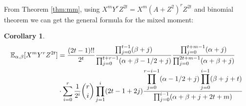 \documentclass[review,authoryear]{elsarticle}
\def\E{\mathbb{E}}
\newtheorem{cor}{Corollary}
\begin{document}
From Theorem \ref{thm:mm},
using $X^m Y^r Z^{2t} = X^m(A+Z^2)^r Z^{2t} $ and
binomial theorem we can get
the general formula for the mixed moment:
\begin{cor}
\begin{align}
\E_{\alpha, \beta}[X^mY^rZ^{2t}] &= \frac{(2t-1)!!}{2^t}
\frac{\prod_{j=0}^{t-1} (\beta+j)}{\prod_{j=0}^{t+r-1} (\alpha+\beta-1/2+j)}
\frac{\prod_{j=0}^{t+m-1}(\alpha+j)}{\prod_{j=0}^{2t+m-1} (\alpha+\beta+j)}\notag\\
&\cdot\sum_{i=0}^r \frac{1}{2^i}\binom{r}{i}\prod_{j=1}^i (2t-1+2j)
\frac{\displaystyle\prod_{j=0}^{r-i-1}(\alpha-1/2+j)
\prod_{j=0}^{i-1}(\beta+j+t)}{\prod_{j=0}^{i-1}(\alpha+\beta+j+2t+m)}
\end{align}
\end{cor}


\end{document}
